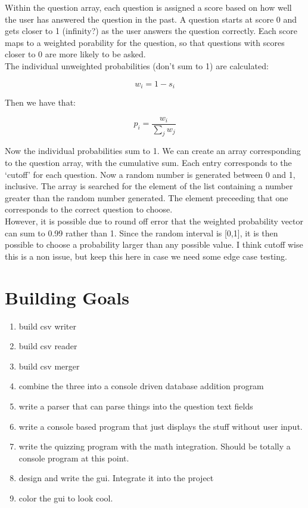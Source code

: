 \documentclass[11pt]{article}
\begin{document}
Within the question array, each question is assigned a score based on how well the user has answered the question in the past. A question starts at score 0 and gets closer to 1 (infinity?) as the user answers the question correctly. Each score maps to a weighted porability for the question, so that questions with scores closer to 0 are more likely to be asked. \\

The individual unweighted probabilities (don't sum to 1) are calculated:

$$ w_i = 1 - s_i $$

Then we have that:

$$ p_i = \frac{w_i}{\sum_j w_j} $$

Now the individual probabilities sum to 1. We can create an array corresponding to the question array, with the cumulative sum. Each entry corresponds to the `cutoff' for each question. Now a random number is generated between 0 and 1, inclusive. The array is searched for the element of the list containing a number greater than the random number generated. The element preceeding that one corresponds to the correct question to choose. \\

However, it is possible due to round off error that the weighted probability vector can sum to 0.99 rather than 1. Since the random interval is [0,1], it is then possible to choose a probability larger than any possible value. I think cutoff wise this is a non issue, but keep this here in case we need some edge case testing.


\section{Building Goals}
\begin{enumerate}
\item build csv writer
\item build csv reader
\item build csv merger
\item combine the three into a console driven database addition program
\item write a parser that can parse things into the question text fields
\item write a console based program that just displays the stuff without user 
  input.
\item write the quizzing program with the math integration. Should be totally a console program 
  at this point.
\item design and write the gui. Integrate it into the project
\item color the gui to look cool.
\end{enumerate}

\end{document}
